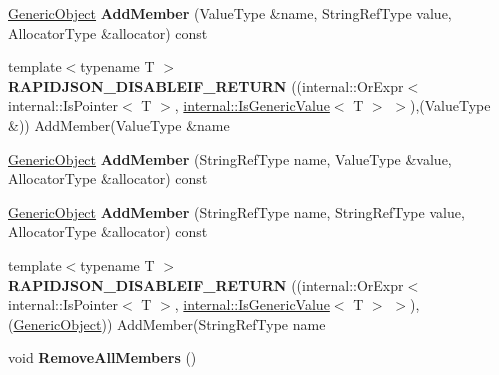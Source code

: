 \begin{DoxyCompactItemize}
\item 
\hyperlink{classGenericObject}{Generic\+Object} {\bfseries Add\+Member} (Value\+Type \&name, String\+Ref\+Type value, Allocator\+Type \&allocator) const \hypertarget{classGenericObject_a33df672a1ecafa47c2d7ed3c765738c1}{}\label{classGenericObject_a33df672a1ecafa47c2d7ed3c765738c1}

\item 
{\footnotesize template$<$typename T $>$ }\\{\bfseries R\+A\+P\+I\+D\+J\+S\+O\+N\+\_\+\+D\+I\+S\+A\+B\+L\+E\+I\+F\+\_\+\+R\+E\+T\+U\+RN} ((internal\+::\+Or\+Expr$<$ internal\+::\+Is\+Pointer$<$ T $>$, \hyperlink{structinternal_1_1IsGenericValue}{internal\+::\+Is\+Generic\+Value}$<$ T $>$ $>$),(Value\+Type \&)) Add\+Member(Value\+Type \&name\hypertarget{classGenericObject_a98ebcec632c41442d89cd8634b7ecc47}{}\label{classGenericObject_a98ebcec632c41442d89cd8634b7ecc47}

\item 
\hyperlink{classGenericObject}{Generic\+Object} {\bfseries Add\+Member} (String\+Ref\+Type name, Value\+Type \&value, Allocator\+Type \&allocator) const \hypertarget{classGenericObject_a245647b72d87ffe6142d1c656f0e92d8}{}\label{classGenericObject_a245647b72d87ffe6142d1c656f0e92d8}

\item 
\hyperlink{classGenericObject}{Generic\+Object} {\bfseries Add\+Member} (String\+Ref\+Type name, String\+Ref\+Type value, Allocator\+Type \&allocator) const \hypertarget{classGenericObject_a5cb6c166992abe5674a287bbc02d8f2f}{}\label{classGenericObject_a5cb6c166992abe5674a287bbc02d8f2f}

\item 
{\footnotesize template$<$typename T $>$ }\\{\bfseries R\+A\+P\+I\+D\+J\+S\+O\+N\+\_\+\+D\+I\+S\+A\+B\+L\+E\+I\+F\+\_\+\+R\+E\+T\+U\+RN} ((internal\+::\+Or\+Expr$<$ internal\+::\+Is\+Pointer$<$ T $>$, \hyperlink{structinternal_1_1IsGenericValue}{internal\+::\+Is\+Generic\+Value}$<$ T $>$ $>$),(\hyperlink{classGenericObject}{Generic\+Object})) Add\+Member(String\+Ref\+Type name\hypertarget{classGenericObject_af361a4b677882964789201fc605541d0}{}\label{classGenericObject_af361a4b677882964789201fc605541d0}

\item 
void {\bfseries Remove\+All\+Members} ()\hypertarget{classGenericObject_a129ce3843a6658e620a7f740d9f44ee1}{}\label{classGenericObject_a129ce3843a6658e620a7f740d9f44ee1}


\end{DoxyCompactItemize}
